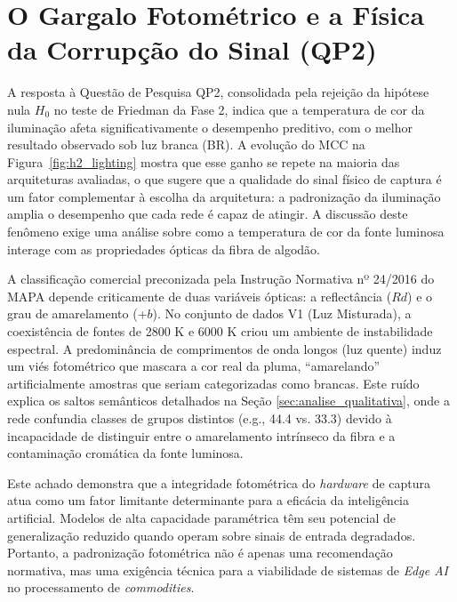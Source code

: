 \section{O Gargalo Fotométrico e a Física da Corrupção do Sinal (QP2)}
\label{sec:gargalo_fotometrico}

A resposta à Questão de Pesquisa QP2, consolidada pela rejeição da hipótese nula $H_{0}$ no teste de Friedman da Fase 2, indica que a temperatura de cor da iluminação afeta significativamente o desempenho preditivo, com o melhor resultado observado sob luz branca (BR). A evolução do MCC na Figura~\ref{fig:h2_lighting} mostra que esse ganho se repete na maioria das arquiteturas avaliadas, o que sugere que a qualidade do sinal físico de captura é um fator complementar à escolha da arquitetura: a padronização da iluminação amplia o desempenho que cada rede é capaz de atingir. A discussão deste fenômeno exige uma análise sobre como a temperatura de cor da fonte luminosa interage com as propriedades ópticas da fibra de algodão.

A classificação comercial preconizada pela Instrução Normativa nº 24/2016 do MAPA depende criticamente de duas variáveis ópticas: a reflectância ($Rd$) e o grau de amarelamento (+$b$). No conjunto de dados V1 (Luz Misturada), a coexistência de fontes de 2800 K e 6000 K criou um ambiente de instabilidade espectral. A predominância de comprimentos de onda longos (luz quente) induz um viés fotométrico que mascara a cor real da pluma, ``amarelando'' artificialmente amostras que seriam categorizadas como brancas. Este ruído explica os saltos semânticos detalhados na Seção \ref{sec:analise_qualitativa}, onde a rede confundia classes de grupos distintos (e.g., 44.4 vs. 33.3) devido à incapacidade de distinguir entre o amarelamento intrínseco da fibra e a contaminação cromática da fonte luminosa.

Este achado demonstra que a integridade fotométrica do \textit{hardware} de captura atua como um fator limitante determinante para a eficácia da inteligência artificial. Modelos de alta capacidade paramétrica têm seu potencial de generalização reduzido quando operam sobre sinais de entrada degradados. Portanto, a padronização fotométrica não é apenas uma recomendação normativa, mas uma exigência técnica para a viabilidade de sistemas de \textit{Edge AI} no processamento de \textit{commodities}.